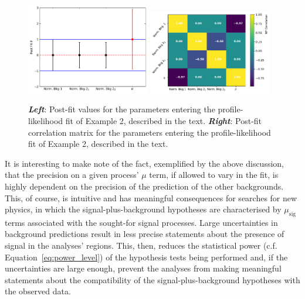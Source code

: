 \begin{figure}[!htb]
    \begin{center}
        \includegraphics[width=0.48\textwidth]{figures/common_ana/stat_hypo/profile_examples/profile_ex_2_pulls}
        \includegraphics[width=0.48\textwidth]{figures/common_ana/stat_hypo/profile_examples/np_corr_ex_2}
        \caption{
            \textbf{\textit{Left}}: Post-fit values for the parameters entering the profile-likelihood fit
                of Example 2,
                described in the text. 
            \textbf{\textit{Right}}: Post-fit correlation matrix for the parameters entering the profile-likelihood
                fit of Example 2, described in the text.
        }
        \label{fig:prof_ex_2_pulls}
    \end{center}
\end{figure}

It is interesting to make note of the fact, exemplified by the above discussion, that the precision on a given process' $\mu$ term,
if allowed to vary in the fit, is highly dependent on the precision of the prediction of the
other backgrounds.
This, of course, is intuitive and has meaningful consequences for searches for new physics, in which the signal-plus-background
hypotheses are characterised by $\mu_{\text{sig}}$ terms associated with the sought-for signal processes.
Large uncertainties in background predictions result in less precise statements about the presence
of signal in the analyses' regions.
This, then, reduces the statistical power (c.f. Equation~\ref{eq:power_level}) of the hypothesis tests
being performed and, if the uncertainties are large enough, prevent the analyses from making meaningful
statements about the compatibility of the signal-plus-background hypotheses with the observed data.

